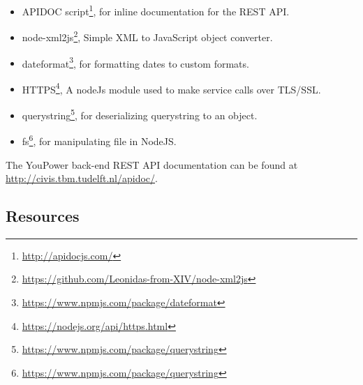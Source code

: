\begin{itemize}
\item APIDOC script\footnote{\url{http://apidocjs.com/}}, for inline documentation for the REST API. 
\item node-xml2js\footnote{\url{https://github.com/Leonidas-from-XIV/node-xml2js}}, Simple XML to JavaScript object converter. 
\item dateformat\footnote{\url{https://www.npmjs.com/package/dateformat}}, for formatting dates to custom formats. 
\item HTTPS\footnote{\url{https://nodejs.org/api/https.html}}, A nodeJs module used to make service calls over TLS/SSL. 
\item querystring\footnote{\url{https://www.npmjs.com/package/querystring}}, for deserializing querystring to an object. 
\item fs\footnote{\url{https://www.npmjs.com/package/querystring}}, for manipulating file in NodeJS. 
\end{itemize}

The YouPower back-end REST API documentation can be found at {\footnotesize\url{http://civis.tbm.tudelft.nl/apidoc/}}. 
% 

\subsection{Resources}